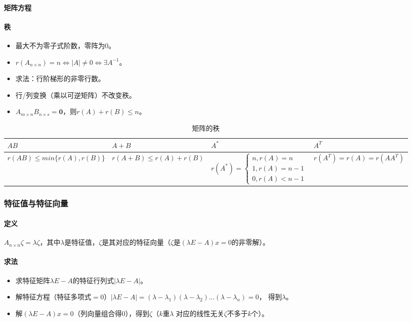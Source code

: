 \documentclass[
12pt, %
a4paper, 
oneside, %
headinclude,footinclude, %
]{scrartcl}
\begin{document}
\paragraph{矩阵方程}
\paragraph{秩}
\begin{itemize}
\item 最大不为零子式阶数，零阵为$ 0 $。
\item $ r(A_{n \times n}) = n \Leftrightarrow |A| \neq 0 \Leftrightarrow \exists A^{-1} $。
\item 求法：行阶梯形的非零行数。
\item 行/列变换（乘以可逆矩阵）不改变秩。
\item $ A_{m \times n}B_{n \times s} = \mathbf{0} $，则$ r(A) + r(B) \leq n $。
\end{itemize}

\begin{table}[hbt]
\caption{矩阵的秩}
\centering
\begin{tabular}{|p{3.8cm}|p{3.8cm}|p{3.8cm}|p{3.8cm}|}
\hline
$ AB $ & $ A + B $ & $ A^* $ & $ A^T $ \\
\hline
$ r(AB) \leq min\{r(A), r(B)\} $ & $ r(A + B) \leq r(A) + r(B) $ & $ r(A^*) = \begin{cases} n, r(A) = n \\ 1,  r(A) = n - 1 \\ 0, r(A) < n - 1 \end{cases} $ & $ r(A^T) = r(A) = r(AA^T) $ \\
\hline
\end{tabular}
\end{table}
\subsubsection[特征值与特征向量]{特征值与特征向量}
\paragraph{定义}
$ A_{n \times n}\zeta = \lambda\zeta $，其中$ \lambda $是特征值，$ \zeta $是其对应的特征向量（$ \zeta $是$ (\lambda E - A)x = 0 $的非零解）。
\paragraph{求法}
\begin{itemize}
\item 求特征矩阵$ \lambda E - A $的特征行列式$ |\lambda E - A| $。
\item 解特征方程（特征多项式$ = 0 $）$ |\lambda E - A| = (\lambda - \lambda_1)(\lambda - \lambda_2)\dots(\lambda - \lambda_n) = 0 $，
得到$ \lambda $。
\item 解$ (\lambda E - A)x = 0 $（列向量组合得$ 0 $），得到$ \zeta $（$ k $重$ \lambda $
对应的线性无关$ \zeta $不多于$ k $个）。
\end{itemize}
\end{document}
